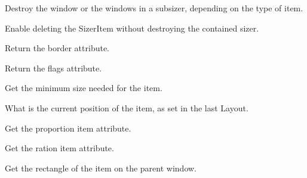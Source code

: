 \label{wxsizeritemdeletewindows}


Destroy the window or the windows in a subsizer, depending on the type
of item.


\label{wxsizeritemdetachsizer}


Enable deleting the SizerItem without destroying the contained sizer.


\label{wxsizeritemgetborder}


Return the border attribute.

\label{wxsizeritemgetflag}


Return the flags attribute.


\label{wxsizeritemgetminsize}


Get the minimum size needed for the item.

\label{wxsizeritemgetposition}


What is the current position of the item, as set in the last Layout.

\label{wxsizeritemgetproportion}


Get the proportion item attribute.

\label{wxsizeritemgetratio}


Get the ration item attribute.

\label{wxsizeritemgetrect}


Get the rectangle of the item on the parent window.

\label{wxsizeritemgetsize}


